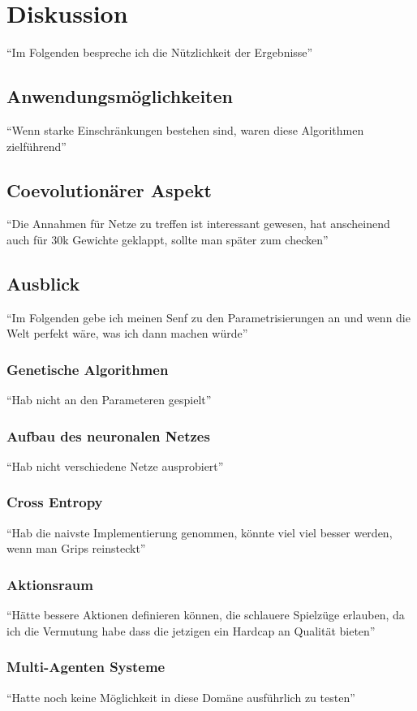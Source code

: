 \chapter{Diskussion}
    ``Im Folgenden bespreche ich die Nützlichkeit der Ergebnisse''
    \section{Anwendungsmöglichkeiten}
        ``Wenn starke Einschränkungen bestehen sind, waren diese Algorithmen zielführend''
    \section{Coevolutionärer Aspekt}
        ``Die Annahmen für Netze zu treffen ist interessant gewesen, hat anscheinend auch für 30k Gewichte geklappt, sollte man später zum checken''

    \section{Ausblick}
        ``Im Folgenden gebe ich meinen Senf zu den Parametrisierungen an und wenn die Welt perfekt wäre, was ich dann machen würde''
        \subsection{Genetische Algorithmen}
            ``Hab nicht an den Parameteren gespielt''
        \subsection{Aufbau des neuronalen Netzes}
            ``Hab nicht verschiedene Netze ausprobiert''
        \subsection{Cross Entropy}
            ``Hab die naivste Implementierung genommen, könnte viel viel besser werden, wenn man Grips reinsteckt''
        \subsection{Aktionsraum}
            ``Hätte bessere Aktionen definieren können, die schlauere Spielzüge erlauben, da ich die Vermutung habe dass die jetzigen ein Hardcap an Qualität bieten''
        \subsection{Multi-Agenten Systeme}
            ``Hatte noch keine Möglichkeit in diese Domäne ausführlich zu testen''

